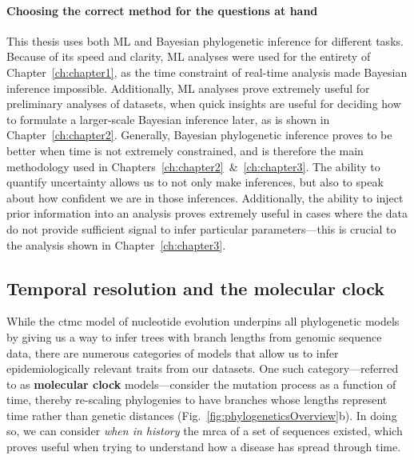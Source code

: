 \paragraph*{Choosing the correct method for the questions at hand}
This thesis uses both ML and Bayesian phylogenetic inference for different tasks.
Because of its speed and clarity, ML analyses were used for the entirety of Chapter~\ref{ch:chapter1}, as the time constraint of real-time analysis made Bayesian inference impossible.
Additionally, ML analyses prove extremely useful for preliminary analyses of datasets, when quick insights are useful for deciding how to formulate a larger-scale Bayesian inference later, as is shown in Chapter~\ref{ch:chapter2}.
Generally, Bayesian phylogenetic inference proves to be better when time is not extremely constrained, and is therefore the main methodology used in Chapters~\ref{ch:chapter2}~\&~\ref{ch:chapter3}.
The ability to quantify uncertainty allows us to not only make inferences, but also to speak about how confident we are in those inferences.
Additionally, the ability to inject prior information into an analysis proves extremely useful in cases where the data do not provide sufficient signal to infer particular parameters---this is crucial to the analysis shown in Chapter~\ref{ch:chapter3}.

\subsection{Temporal resolution and the molecular clock}\label{ssec:molClock}
While the \gls{ctmc} model of nucleotide evolution underpins all phylogenetic models by giving us a way to infer trees with branch lengths from genomic sequence data, there are numerous categories of models that allow us to infer epidemiologically relevant traits from our datasets.
One such category---referred to as \textbf{molecular clock} models---consider the mutation process as a function of time, thereby re-scaling phylogenies to have branches whose lengths represent time rather than genetic distances (Fig.~\ref{fig:phylogeneticsOverview}b).
In doing so, we can consider \textit{when in history} the \gls{mrca} of a set of sequences existed, which proves useful when trying to understand how a disease has spread through time.

